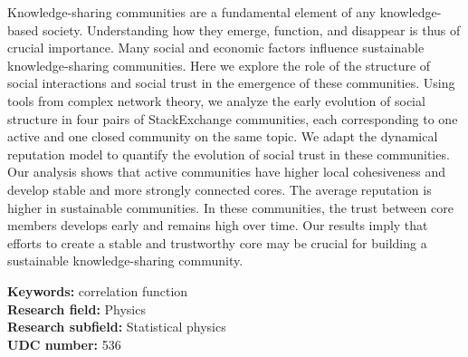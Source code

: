 Knowledge-sharing communities are a fundamental element of any knowledge-based society. Understanding how they emerge, function, and disappear is thus of crucial importance. Many social and economic factors influence sustainable knowledge-sharing communities. Here we explore the role of the structure of social interactions and social trust in the emergence of these communities. Using tools from complex network theory, we analyze the early evolution of social structure in four pairs of StackExchange communities, each corresponding to one active and one closed community on the same topic. We adapt the dynamical reputation model to quantify the evolution of social trust in these communities. Our analysis shows that active communities have higher local cohesiveness and develop stable and more strongly connected cores. The average reputation is higher in sustainable communities. In these communities, the trust between core members develops early and remains high over time. Our results imply that efforts to create a stable and trustworthy core may be crucial for building a sustainable knowledge-sharing community.


\noindent
{\textbf {Keywords:}} %
correlation function\\
{\textbf {Research field:}} Physics \\
{\textbf {Research subfield:}} Statistical physics\\
\textbf{UDC number:} 536 %

\hfill

\justify
